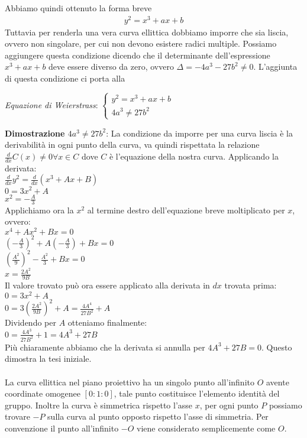 \documentclass[a4paper,12pt]{tesiinfo}
\begin{document}
Abbiamo quindi ottenuto la forma breve
\begin{gather}
y^2 = x^3 + ax+b
\end{gather}
Tuttavia per renderla una vera curva ellittica dobbiamo imporre che sia liscia, ovvero non singolare, per cui non devono esistere radici multiple. Possiamo aggiungere questa condizione dicendo che il determinante dell'espressione $x^3 + ax+b$ deve essere diverso da zero, ovvero $\Delta = -4a^3 - 27b^2 \ne 0$. L'aggiunta di questa condizione ci porta alla
\begin{center}
\textit{Equazione di Weierstrass}:
$\begin{cases}
y^2 = x^3 + ax+b\\
4a^3 \ne 27b^2\end{cases}$
\end{center}
\textbf{Dimostrazione $4a^3 \ne 27b^2$}: La condizione da imporre per una curva liscia \`e la derivabilit\`a in ogni punto della curva, va quindi rispettata la relazione $\frac{d}{dx}C(x) \ne 0 \forall x \in C$ dove $C$ \`e l'equazione della nostra curva. Applicando la derivata:\\
$\frac{d}{dx}y^2 = \frac{d}{dx}(x^3 +Ax+B)$\\
$0 = 3x^2 +A$\\
$x^2 = -\frac{A}{3}$\\
Applichiamo ora la $x^2$ al termine destro dell'equazione breve moltiplicato per $x$, ovvero:\\
$x^4 + Ax^2+Bx = 0$ \\
$(-\frac{A}{3})^2 + A(-\frac{A}{3})+Bx = 0$\\
$(\frac{A^2}{9})^2 - \frac{A^2}{3}+Bx = 0$\\
$x = \frac{2A^2}{9B}$\\
Il valore trovato pu\`o ora essere applicato alla derivata in $dx$ trovata prima:\\
$0 = 3x^2 +A$\\
$0 = 3(\frac{2A^2}{9B})^2 +A = \frac{4A^4}{27B^2} +A $\\
Dividendo per $A$ otteniamo finalmente:\\
$0 = \frac{4A^3}{27B^2} +1 = 4A^3+27B$\\
Pi\`u chiaramente abbiamo che la derivata si annulla per $4A^3+27B = 0$. Questo dimostra la tesi iniziale.\\
\\
La curva ellittica nel piano proiettivo ha un singolo punto all'infinito $O$ avente coordinate omogenee $[0:1:0]$, tale punto costituisce l'elemento identit\`a del gruppo. Inoltre la curva \`e simmetrica rispetto l'asse $x$, per ogni punto $P$ possiamo trovare $-P$ sulla curva al punto opposto rispetto l'asse di simmetria. Per convenzione il punto all'infinito $-O$ viene considerato semplicemente come $O$.\\
\end{document}
